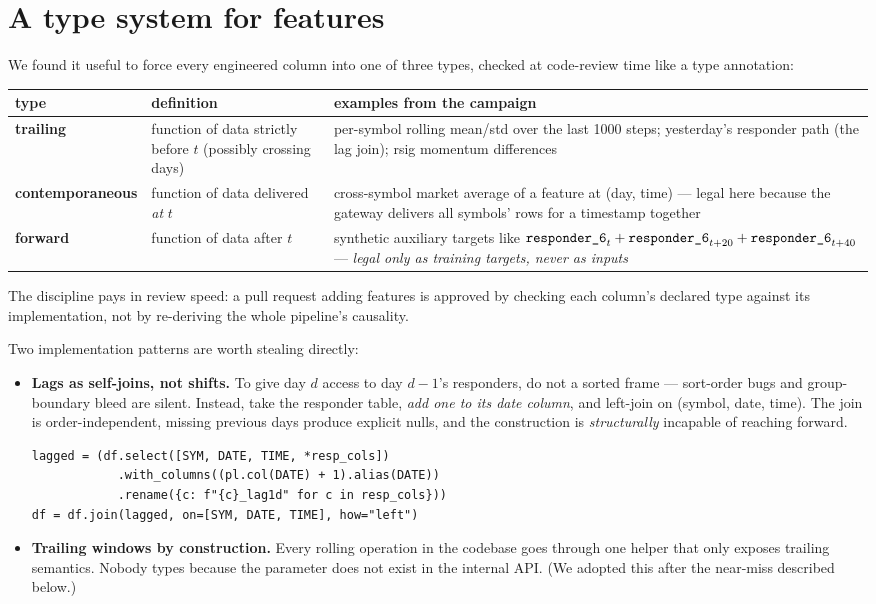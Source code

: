 \section{A type system for features}

We found it useful to force every engineered column into one of three
types, checked at code-review time like a type annotation:

\begin{center}
\begin{tabularx}{\textwidth}{@{}lXX@{}}
\toprule
type & definition & examples from the campaign \\
\midrule
\textbf{trailing} & function of data strictly before $t$ (possibly
crossing days) & per-symbol rolling mean/std over the last 1000 steps;
yesterday's responder path (the lag join); rsig momentum differences \\
\textbf{contemporaneous} & function of data delivered \emph{at} $t$ &
cross-symbol market average of a feature at (day, time) --- legal here
because the gateway delivers all symbols' rows for a timestamp together \\
\textbf{forward} & function of data after $t$ & synthetic auxiliary
targets like $\texttt{responder\_6}_{t} + \texttt{responder\_6}_{t+20} + \texttt{responder\_6}_{t+40}$ ---
\emph{legal only as training targets, never as inputs} \\
\bottomrule
\end{tabularx}
\end{center}

The discipline pays in review speed: a pull request adding features is
approved by checking each column's declared type against its
implementation, not by re-deriving the whole pipeline's causality.

Two implementation patterns are worth stealing directly:

\begin{itemize}
\item \textbf{Lags as self-joins, not shifts.} To give day $d$ access to
  day $d{-}1$'s responders, do not  a sorted frame ---
  sort-order bugs and group-boundary bleed are silent. Instead, take the
  responder table, \emph{add one to its date column}, and left-join on
  (symbol, date, time). The join is order-independent, missing previous
  days produce explicit nulls, and the construction is \emph{structurally}
  incapable of reaching forward.
\begin{lstlisting}
lagged = (df.select([SYM, DATE, TIME, *resp_cols])
            .with_columns((pl.col(DATE) + 1).alias(DATE))
            .rename({c: f"{c}_lag1d" for c in resp_cols}))
df = df.join(lagged, on=[SYM, DATE, TIME], how="left")
\end{lstlisting}
\item \textbf{Trailing windows by construction.} Every rolling operation in
  the codebase goes through one helper that only exposes trailing
  semantics. Nobody types  because the parameter does not
  exist in the internal API. (We adopted this after the near-miss described
  below.)
\end{itemize}

